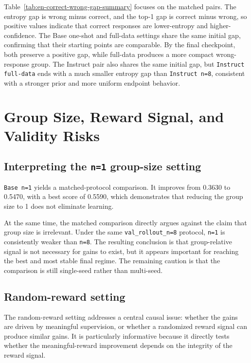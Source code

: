 \documentclass[12pt,a4paper]{ctexart}
\begin{document}
Table~\ref{tab:en-correct-wrong-gap-summary} focuses on the matched pairs. The entropy gap is wrong minus correct, and the top-1 gap is correct minus wrong, so positive values indicate that correct responses are lower-entropy and higher-confidence. The Base one-shot and full-data settings share the same initial gap, confirming that their starting points are comparable. By the final checkpoint, both preserve a positive gap, while full-data produces a more compact wrong-response group. The Instruct pair also shares the same initial gap, but \texttt{Instruct full-data} ends with a much smaller entropy gap than \texttt{Instruct n=8}, consistent with a stronger prior and more uniform endpoint behavior.

\section{Group Size, Reward Signal, and Validity Risks}

\subsection{Interpreting the \texttt{n=1} group-size setting}

\texttt{Base n=1} yields a matched-protocol comparison. It improves from 0.3630 to 0.5470, with a best score of 0.5590, which demonstrates that reducing the group size to 1 does not eliminate learning.

At the same time, the matched comparison directly argues against the claim that group size is irrelevant. Under the same \texttt{val\_rollout\_n=8} protocol, \texttt{n=1} is consistently weaker than \texttt{n=8}. The resulting conclusion is that group-relative signal is not necessary for gains to exist, but it appears important for reaching the best and most stable final regime. The remaining caution is that the comparison is still single-seed rather than multi-seed.

\subsection{Random-reward setting}

The random-reward setting addresses a central causal issue: whether the gains are driven by meaningful supervision, or whether a randomized reward signal can produce similar gains. It is particularly informative because it directly tests whether the meaningful-reward improvement depends on the integrity of the reward signal.
\end{document}
